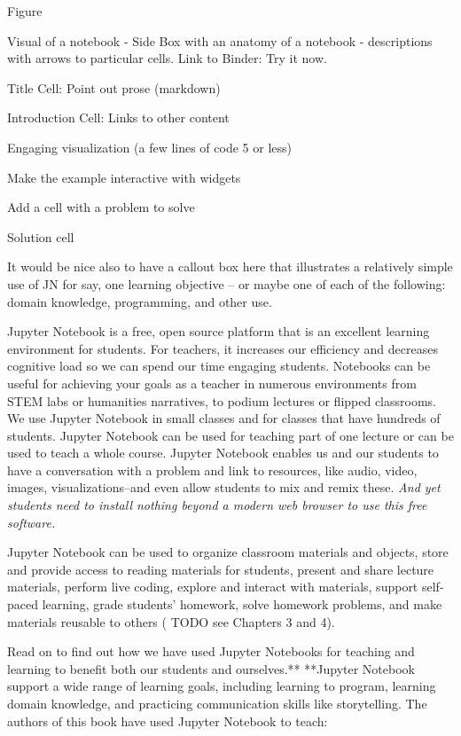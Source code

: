\documentclass[]{book}
\begin{document}
Figure

Visual of a notebook - Side Box with an anatomy of a notebook -
descriptions with arrows to particular cells. Link to Binder: Try it
now.

Title Cell: Point out prose (markdown)

Introduction Cell: Links to other content

Engaging visualization (a few lines of code 5 or less)

Make the example interactive with widgets

Add a cell with a problem to solve

Solution cell

It would be nice also to have a callout box here that illustrates a
relatively simple use of JN for say, one learning objective -- or maybe
one of each of the following: domain knowledge, programming, and other
use.

Jupyter Notebook is a free, open source platform that is an excellent
learning environment for students. For teachers, it increases our
efficiency and decreases cognitive load so we can spend our time
engaging students. Notebooks can be useful for achieving your goals as a
teacher in numerous environments from STEM labs or humanities
narratives, to podium lectures or flipped classrooms. We use Jupyter
Notebook in small classes and for classes that have hundreds of
students. Jupyter Notebook can be used for teaching part of one lecture
or can be used to teach a whole course. Jupyter Notebook enables us and
our students to have a conversation with a problem and link to
resources, like audio, video, images, visualizations--and even allow
students to mix and remix these. \emph{And yet students need to install
nothing beyond a modern web browser to use this free software.}

Jupyter Notebook can be used to organize classroom materials and
objects, store and provide access to reading materials for students,
present and share lecture materials, perform live coding, explore and
interact with materials, support self-paced learning, grade students'
homework, solve homework problems, and make materials reusable to others
( TODO see Chapters 3 and 4).

Read on to find out how we have used Jupyter Notebooks for teaching and
learning to benefit both our students and ourselves.** **Jupyter
Notebook support a wide range of learning goals, including learning to
program, learning domain knowledge, and practicing communication skills
like storytelling. The authors of this book have used Jupyter Notebook
to teach:
\end{document}
